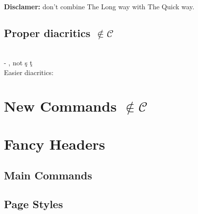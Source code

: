\documentclass[11pt,a4paper]{report}
\newcommand{\package}[1]{\code{\usepackage{#1}}\label{#1}}
\newcommand{\noncurs}{\hspace{.5cm}$\notin \mathscr{C}$}
\newcommand{\codeshow}[1]{\code{#1} - #1}
\newcommand{\subsectionNoncurs}[1]{\subsection[#1]{#1 \noncurs}}
\newcommand{\disclamer}[1]{\textbf{Disclamer:} #1}
\begin{document}
{\disclamer{don't combine The Long way with The Quick way.}

\subsectionNoncurs{Proper diacritics}
\package{combelow}\\
\codeshow{ , not \c{s} \c{t}}\\
Easier diacritics:
\begin{latex}
\code{\usepackage[romanian]{babel}}
\end{latex}

\section[New Commands]{New Commands \noncurs}
\begin{latex}
\newcommand{\mat}[1]{\mathcal{M}_{#1}(\mathbb{R})}
\renewcommand{\contentsname}{Cuprins}

\usepackage{xparse}
\newenvironment{\name}{begin}{end}

\end{latex}

\section{Fancy Headers}
  \subsection{Main Commands}

\begin{latex}
\pagestyle{fancy}
\thispagestyle{fancy} %
\lhead{\nouppercase{\leftmark}}
\chead{\chaptername}
\rhead{\rightmark}
\lfoot{\thechapter}
\cfoot{\thepage}
\rfoot{\thesection}

\fancyhf{} %
\end{latex}

\pagestyle{fancy}

\subsection{Page Styles}

}
\end{document}
